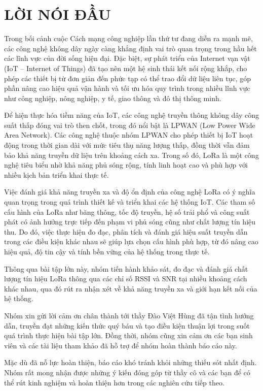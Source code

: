 \documentclass{article}
\begin{document}
	
	\section*{LỜI NÓI ĐẦU}
	\thispagestyle{empty}
	
	Trong bối cảnh cuộc Cách mạng công nghiệp lần thứ tư đang diễn ra mạnh mẽ, các công nghệ không dây ngày càng khẳng định vai trò quan trọng trong hầu hết các lĩnh vực của đời sống hiện đại. Đặc biệt, sự phát triển của Internet vạn vật (IoT – Internet of Things) đã tạo nên một hệ sinh thái kết nối rộng khắp, cho phép các thiết bị từ đơn giản đến phức tạp có thể trao đổi dữ liệu liên tục, góp phần nâng cao hiệu quả vận hành và tối ưu hóa quy trình trong nhiều lĩnh vực như công nghiệp, nông nghiệp, y tế, giao thông và đô thị thông minh.
	
	Để hiện thực hóa tiềm năng của IoT, các công nghệ truyền thông không dây công suất thấp đóng vai trò then chốt, trong đó nổi bật là LPWAN (Low Power Wide Area Network). Các công nghệ thuộc nhóm LPWAN cho phép thiết bị IoT hoạt động trong thời gian dài với mức tiêu thụ năng lượng thấp, đồng thời vẫn đảm bảo khả năng truyền dữ liệu trên khoảng cách xa. Trong số đó, LoRa là một công nghệ tiêu biểu nhờ khả năng phủ sóng rộng, tính linh hoạt cao và phù hợp với nhiều kịch bản triển khai thực tế.
	
	Việc đánh giá khả năng truyền xa và độ ổn định của công nghệ LoRa có ý nghĩa quan trọng trong quá trình thiết kế và triển khai các hệ thống IoT. Các tham số cấu hình của LoRa như băng thông, tốc độ truyền, hệ số trải phổ và công suất phát có ảnh hưởng trực tiếp đến phạm vi phủ sóng cũng như chất lượng tín hiệu thu. Do đó, việc thực hiện đo đạc, phân tích và đánh giá hiệu suất truyền dẫn trong các điều kiện khác nhau sẽ giúp lựa chọn cấu hình phù hợp, từ đó nâng cao hiệu quả, độ tin cậy và tính bền vững của hệ thống trong thực tế.
	
	Thông qua bài tập lớn này, nhóm tiến hành khảo sát, đo đạc và đánh giá chất lượng tín hiệu LoRa thông qua các chỉ số RSSI và SNR tại nhiều khoảng cách khác nhau, qua đó rút ra nhận xét về khả năng truyền xa và giới hạn kết nối của hệ thống.
	
	Nhóm xin gửi lời cảm ơn chân thành tới thầy Đào Việt Hùng đã tận tình hướng dẫn, truyền đạt những kiến thức quý báu và tạo điều kiện thuận lợi trong suốt quá trình thực hiện bài tập lớn. Đồng thời, nhóm cũng xin cảm ơn các bạn sinh viên và các tài liệu tham khảo đã hỗ trợ để nhóm hoàn thành báo cáo này.
	
	Mặc dù đã nỗ lực hoàn thiện, báo cáo khó tránh khỏi những thiếu sót nhất định. Nhóm rất mong nhận được những ý kiến đóng góp từ thầy cô và các bạn để có thể rút kinh nghiệm và hoàn thiện hơn trong các nghiên cứu tiếp theo.
	
\end{document}
